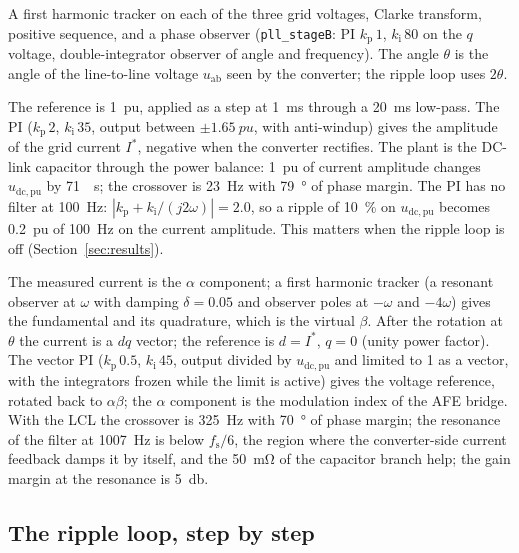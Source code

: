 \documentclass[11pt,a4paper]{scrartcl}
\newcommand{\ped}[1]{_{\mathrm{#1}}}
\newcommand{\code}[1]{\texttt{#1}}
\begin{document}
\begin{onehalfspace}
\begin{description}[nosep, leftmargin=1.5em]
	\item[PLL.] A first harmonic tracker on each of the three grid voltages, Clarke transform, positive sequence, and a phase observer (\code{pll\_stageB}: PI $k\ped{p}\,1$, $k\ped{i}\,80$ on the $q$ voltage, double-integrator observer of angle and frequency). The angle $\theta$ is the angle of the line-to-line voltage $u\ped{ab}$ seen by the converter; the ripple loop uses $2\theta$.
	\item[DC-link voltage loop.] The reference is \SI{1}{pu}, applied as a step at \SI{1}{\milli\second} through a \SI{20}{\milli\second} low-pass. The PI ($k\ped{p}\,2$, $k\ped{i}\,35$, output between $\pm\SI{1.65}{pu}$, with anti-windup) gives the amplitude of the grid current $I^*$, negative when the converter rectifies. The plant is the DC-link capacitor through the power balance: \SI{1}{pu} of current amplitude changes $u\ped{dc,pu}$ by \SI{71}{\per\second}; the crossover is \SI{23}{\hertz} with \SI{79}{\degree} of phase margin. The PI has no filter at \SI{100}{\hertz}: $|k\ped{p} + k\ped{i}/(j 2\omega)| = 2.0$, so a ripple of \SI{10}{\percent} on $u\ped{dc,pu}$ becomes \SI{0.2}{pu} of \SI{100}{\hertz} on the current amplitude. This matters when the ripple loop is off (Section~\ref{sec:results}).
	\item[Grid current loop.] The measured current is the $\alpha$ component; a first harmonic tracker (a resonant observer at $\omega$ with damping $\delta = 0.05$ and observer poles at $-\omega$ and $-4\omega$) gives the fundamental and its quadrature, which is the virtual $\beta$. After the rotation at $\theta$ the current is a $dq$ vector; the reference is $d = I^*$, $q = 0$ (unity power factor). The vector PI ($k\ped{p}\,0.5$, $k\ped{i}\,45$, output divided by $u\ped{dc,pu}$ and limited to 1 as a vector, with the integrators frozen while the limit is active) gives the voltage reference, rotated back to $\alpha\beta$; the $\alpha$ component is the modulation index of the AFE bridge. With the LCL the crossover is \SI{325}{\hertz} with \SI{70}{\degree} of phase margin; the resonance of the filter at \SI{1007}{\hertz} is below $f\ped{s}/6$, the region where the converter-side current feedback damps it by itself, and the \SI{50}{\milli\ohm} of the capacitor branch help; the gain margin at the resonance is \SI{5}{\decibel}.
\end{description}

\subsection{The ripple loop, step by step}
\label{sec:ripple_loop}


\end{onehalfspace}
\end{document}
